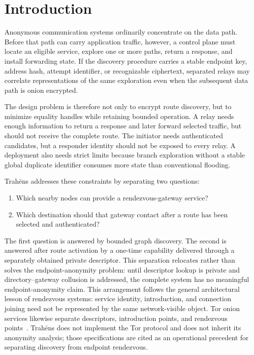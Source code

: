 \documentclass[11pt,oneside]{article}
\newcommand{\ProtoName}{Trah\={e}ns}
\begin{document}
\section{Introduction}
\label{sec:introduction}

Anonymous communication systems ordinarily concentrate on the data path. Before that path can carry application traffic, however, a control plane must locate an eligible service, explore one or more paths, return a response, and install forwarding state. If the discovery procedure carries a stable endpoint key, address hash, attempt identifier, or recognizable ciphertext, separated relays may correlate representations of the same exploration even when the subsequent data path is onion encrypted.

The design problem is therefore not only to encrypt route discovery, but to minimize equality handles while retaining bounded operation. A relay needs enough information to return a response and later forward selected traffic, but should not receive the complete route. The initiator needs authenticated candidates, but a responder identity should not be exposed to every relay. A deployment also needs strict limits because branch exploration without a stable global duplicate identifier consumes more state than conventional flooding.

\ProtoName{} addresses these constraints by separating two questions:

\begin{enumerate}
  \item Which nearby nodes can provide a rendezvous-gateway service?
  \item Which destination should that gateway contact after a route has been selected and authenticated?
\end{enumerate}

The first question is answered by bounded graph discovery. The second is answered after route activation by a one-time capability delivered through a separately obtained private descriptor. This separation relocates rather than solves the endpoint-anonymity problem: until descriptor lookup is private and directory--gateway collusion is addressed, the complete system has no meaningful endpoint-anonymity claim. This arrangement follows the general architectural lesson of rendezvous systems: service identity, introduction, and connection joining need not be represented by the same network-visible object. Tor onion services likewise separate descriptors, introduction points, and rendezvous points~\cite{toroverview,torrendezvous,torintro}. \ProtoName{} does not implement the Tor protocol and does not inherit its anonymity analysis; those specifications are cited as an operational precedent for separating discovery from endpoint rendezvous.
\end{document}
